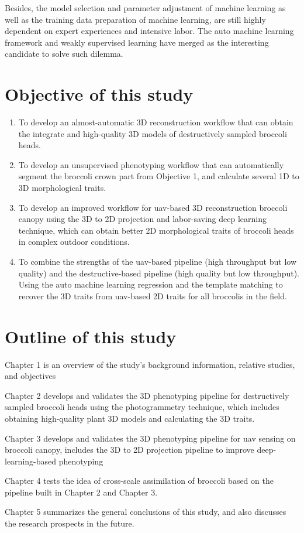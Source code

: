 
Besides, the model selection and parameter adjustment of machine learning as well as the training data preparation of machine learning, are still highly dependent on expert experiences and intensive labor. The auto machine learning framework and weakly supervised learning have merged as the interesting candidate to solve such dilemma.

\section{Objective of this study}

\begin{enumerate}
    \item To develop an almost-automatic 3D reconstruction workflow that can obtain the integrate and high-quality 3D models of destructively sampled broccoli heads.
    \item To develop an unsupervised phenotyping workflow that can automatically segment the broccoli crown part from Objective 1, and calculate several 1D to 3D morphological traits.
    \item To develop an improved workflow for \gls{uav}-based 3D reconstruction broccoli canopy using the 3D to 2D projection and labor-saving deep learning technique, which can obtain better 2D morphological traits of broccoli heads in complex outdoor conditions.
    \item To combine the strengths of the \gls{uav}-based pipeline (high throughput but low quality) and the destructive-based pipeline (high quality but low throughput). Using the auto machine learning regression and the template matching to recover the 3D traits from \gls{uav}-based 2D traits for all broccolis in the field.

\end{enumerate}


\section{Outline of this study}

Chapter 1 is an overview of the study's background information, relative studies, and objectives

Chapter 2 develops and validates the 3D phenotyping pipeline for destructively sampled broccoli heads using the photogrammetry technique, which includes obtaining high-quality plant 3D models and calculating the 3D traits.


Chapter 3 develops and validates the 3D phenotyping pipeline for \gls{uav} sensing on broccoli canopy, includes the 3D to 2D projection pipeline to improve deep-learning-based phenotyping

Chapter 4 tests the idea of cross-scale assimilation of broccoli based on the pipeline built in Chapter 2 and Chapter 3.

Chapter 5 summarizes the general conclusions of this study, and also discusses the research prospects in the future.